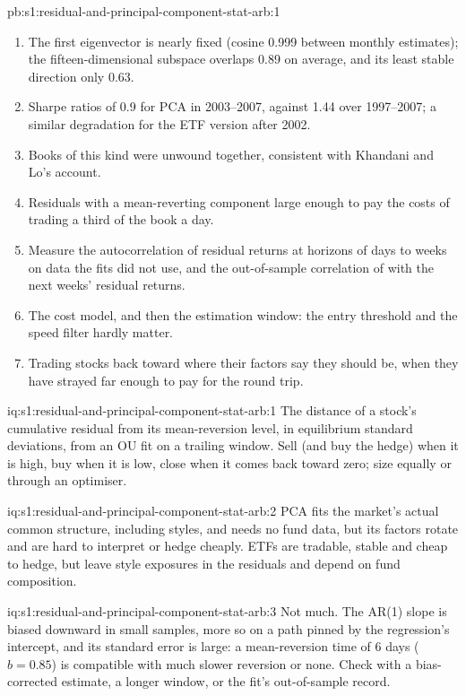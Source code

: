 \begin{solution}{pb:s1:residual-and-principal-component-stat-arb:1}
\begin{enumerate}
\item The first eigenvector is nearly fixed (cosine 0.999 between monthly estimates); the fifteen-dimensional subspace overlaps 0.89 on average, and its least
stable direction only 0.63.
\item Sharpe ratios of 0.9 for PCA in 2003--2007, against 1.44 over 1997--2007; a similar degradation for the ETF version after 2002.
\item Books of this kind were unwound together, consistent with Khandani and Lo's account.
\item Residuals with a mean-reverting component large enough to pay the costs of trading a third of the book a day.
\item Measure the autocorrelation of residual returns at horizons of days to weeks on data the fits did not use, and the out-of-sample correlation of 
with the next weeks' residual returns.
\item The cost model, and then the estimation window: the entry threshold and the speed filter hardly matter.
\item Trading stocks back toward where their factors say they should be, when they have strayed far enough to pay for the round trip.
\end{enumerate}
\end{solution}

\begin{solution}{iq:s1:residual-and-principal-component-stat-arb:1}
The distance of a stock's cumulative residual from its mean-reversion level, in equilibrium standard deviations, from an OU fit on a trailing window. Sell
(and buy the hedge) when it is high, buy when it is low, close when it comes back toward zero; size equally or through an optimiser.
\end{solution}

\begin{solution}{iq:s1:residual-and-principal-component-stat-arb:2}
PCA fits the market's actual common structure, including styles, and needs no fund data, but its factors rotate and are hard to interpret or hedge cheaply.
ETFs are tradable, stable and cheap to hedge, but leave style exposures in the residuals and depend on fund composition.
\end{solution}

\begin{solution}{iq:s1:residual-and-principal-component-stat-arb:3}
Not much. The AR(1) slope is biased downward in small samples, more so on a path pinned by the regression's intercept, and its standard error is large: a
mean-reversion time of 6 days ($b = 0.85$) is compatible with much slower reversion or none. Check with a bias-corrected estimate, a longer window, or the
fit's out-of-sample record.
\end{solution}

